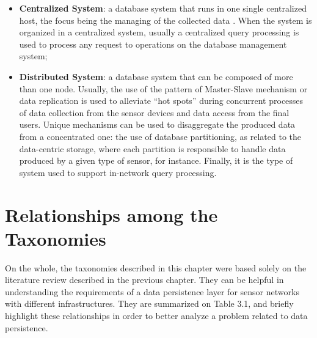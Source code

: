 \begin{itemize}
  \item \textbf{Centralized System}: a database system that runs in one single
  centralized host, the focus being the managing of the collected data
  \cite{sn-intro01}. When the system is organized in a centralized system,
  usually a centralized query processing is used to process any request to
  operations on the database management system;
  \item \textbf{Distributed System}: a database system that can be composed of
  more than one node. Usually, the use of the pattern of Master-Slave
  mechanism or data replication \cite{sn-data-center-replication-load-balance} 
  is used to alleviate ``hot spots'' during concurrent processes of data
  collection from the sensor devices and data access from the final users.
  Unique mechanisms can be used to disaggregate the produced data from a
  concentrated one: the use of database partitioning, as related to the
  data-centric storage, where each partition is responsible to handle data
 produced by a given type of sensor, for instance. Finally, it is the type of
 system used to support in-network query processing.
\end{itemize}

\section{Relationships among the Taxonomies}

On the whole, the taxonomies described in this chapter were based solely on the
literature review described in the previous chapter. They can be helpful in 
understanding the requirements of a data persistence layer for sensor networks
with different infrastructures. They are summarized on Table 3.1, and briefly
highlight these relationships in order to better analyze a problem related to data persistence.

